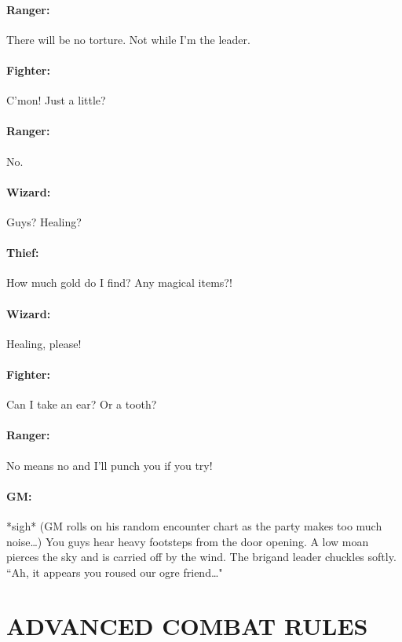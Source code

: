 \begin{multicols}{2}
\paragraph{Ranger:}  There will be no torture.  Not while I'm the leader.

\paragraph{Fighter:}  C'mon!  Just a little?

\paragraph{Ranger:}  No.

\paragraph{Wizard:}  Guys?  Healing?

\paragraph{Thief:}  How much gold do I find? Any magical items?!

\paragraph{Wizard:} Healing, please!

\paragraph{Fighter:} Can I take an ear?  Or a tooth?

\paragraph{Ranger:} No means no and I'll punch you if you try!

\paragraph{GM:} *sigh* (GM rolls on his random encounter chart as the party makes too much noise\ldots) You guys hear heavy footsteps from the door opening.  A low moan pierces the sky and is carried off by the wind.  The brigand leader chuckles softly.  ``Ah, it appears you roused our ogre friend\ldots"

\section{ADVANCED COMBAT RULES}


\end{multicols}
